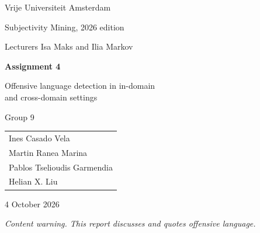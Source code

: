 \documentclass[11pt,a4paper]{article}
\begin{document}

\begin{titlepage}
    \centering
    \vspace*{2cm}

    {\Large Vrije Universiteit Amsterdam\par}
    \vspace{0.4cm}

    {\large Subjectivity Mining, 2026 edition\par}
    \vspace{0.2cm}

    {\large Lecturers Isa Maks and Ilia Markov\par}

    \vspace{3.5cm}

    {\huge\bfseries Assignment 4\par}
    \vspace{0.5cm}

    {\LARGE Offensive language detection in in-domain\\[0.2cm] and cross-domain settings\par}

    \vspace{3cm}

    {\Large Group 9\par}
    \vspace{0.8cm}

    {\large
    \begin{tabular}{l}
        Ines Casado Vela \\
        Martin Ranea Marina \\
        Pablos Tselioudis Garmendia \\
        Helian X. Liu \\
    \end{tabular}\par}

    \vfill

    {\large 4 October 2026\par}

\end{titlepage}

\tableofcontents
\newpage

\noindent\textit{Content warning. This report discusses and quotes offensive language.}

\end{document}
